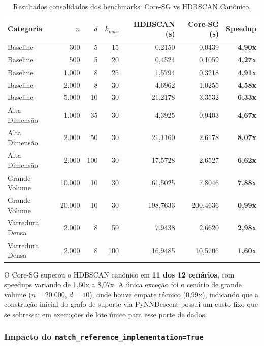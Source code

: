 \documentclass[12pt,a4paper,oneside]{article}
\begin{document}
\begin{table}[htbp]
  \centering
  \caption{Resultados consolidados dos benchmarks: Core-SG vs HDBSCAN Canônico.}
  \label{tab:benchmark_consolidado}
  \begin{tabular}{lrrrrrr}
    \toprule
    \textbf{Categoria} & \textbf{$n$} & \textbf{$d$} & \textbf{$k_{max}$} &
    \textbf{HDBSCAN (s)} & \textbf{Core-SG (s)} & \textbf{Speedup} \\
    \midrule
    Baseline & 300 & 5 & 15 & 0,2150 & 0,0439 & \textbf{4,90x} \\
    Baseline & 500 & 5 & 20 & 0,4524 & 0,1059 & \textbf{4,27x} \\
    Baseline & 1.000 & 8 & 25 & 1,5794 & 0,3218 & \textbf{4,91x} \\
    Baseline & 2.000 & 8 & 30 & 4,6962 & 1,0255 & \textbf{4,58x} \\
    Baseline & 5.000 & 10 & 30 & 21,2178 & 3,3532 & \textbf{6,33x} \\
    Alta Dimensão & 1.000 & 35 & 30 & 4,3925 & 0,9403 & \textbf{4,67x} \\
    Alta Dimensão & 2.000 & 50 & 30 & 21,1160 & 2,6178 & \textbf{8,07x} \\
    Alta Dimensão & 2.000 & 100 & 30 & 17,5728 & 2,6527 & \textbf{6,62x} \\
    Grande Volume & 10.000 & 10 & 30 & 61,5025 & 7,8046 & \textbf{7,88x} \\
    Grande Volume & 20.000 & 10 & 30 & 198,7633 & 200,4636 & \textbf{0,99x} \\
    Varredura Densa & 2.000 & 8 & 50 & 7,9438 & 2,6620 & \textbf{2,98x} \\
    Varredura Densa & 2.000 & 8 & 100 & 16,9485 & 10,5706 & \textbf{1,60x} \\
    \bottomrule
  \end{tabular}
\end{table}

O Core-SG superou o HDBSCAN canônico em \textbf{11 dos 12 cenários}, com speedups variando de
1,60x a 8,07x. A única exceção foi o cenário de grande volume ($n=20.000$, $d=10$), onde
houve empate técnico (0,99x), indicando que a construção inicial do grafo de suporte via
PyNNDescent possui um custo fixo que se sobressai em execuções de lote único para esse porte
de dados.

\subsubsection{Impacto do \texttt{match\_reference\_implementation=True}}
\end{document}
